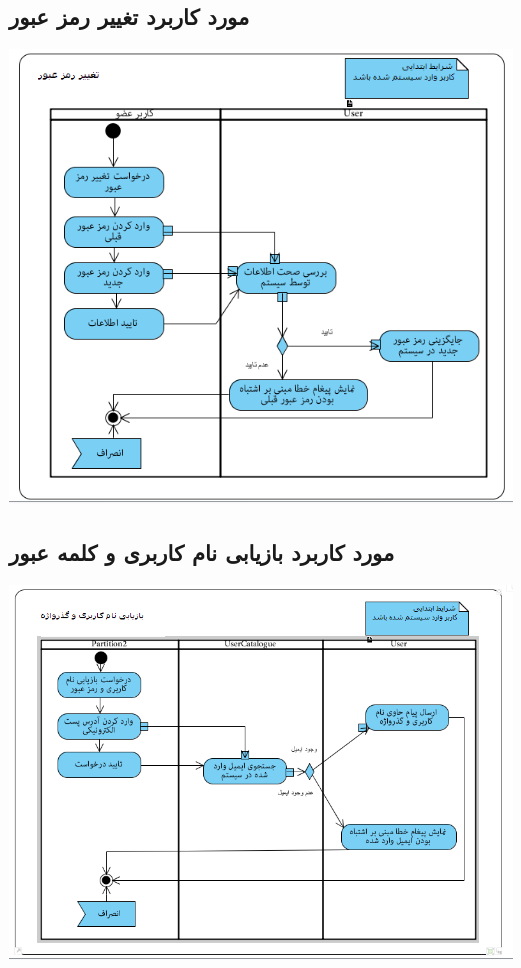 \subsection*{مورد کاربرد تغییر رمز عبور}
\vspace{2cm}
\begin{center}
\includegraphics[width=\textwidth]{ActivityDiagramsWithSwimlanes/12.png}
\end{center}

\newpage
\vspace{2cm}
\subsection*{مورد کاربرد بازیابی نام کاربری و کلمه عبور}
\vspace{2cm}
\begin{center}
\includegraphics[width=\textwidth]{ActivityDiagramsWithSwimlanes/13.png}
\end{center}


